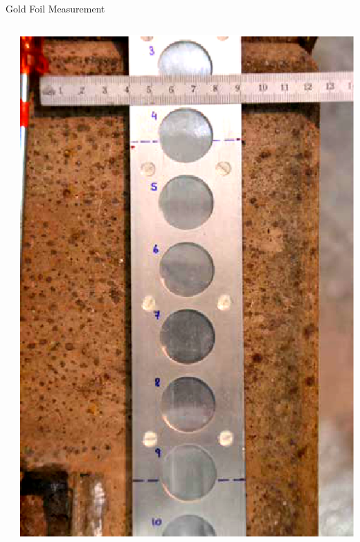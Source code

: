 \documentclass[final,t]{beamer}
\begin{document}
\begin{frame}{}
\begin{columns}[t]
\begin{column}{.3\linewidth}
\begin{block}{Gold Foil Measurement}
\begin{columns}[T]
\begin{column}{.65\linewidth}
            
          \end{column}
          \begin{column}{.35\linewidth}
            \includegraphics*[angle=90,width=\linewidth]{foils.eps}
          \end{column}
        \end{columns}
      \end{block}



      \end{column}




\end{columns}
\end{frame}
\end{document}
